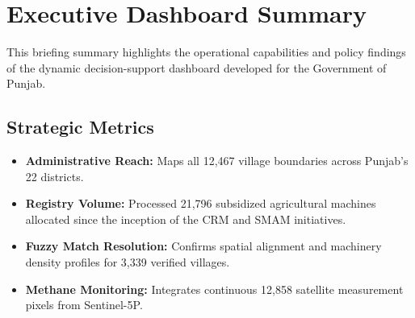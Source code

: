 \documentclass[12pt,a4paper]{report}
\begin{document}
\newpage

\chapter*{Executive Dashboard Summary}
This briefing summary highlights the operational capabilities and policy findings of the dynamic decision-support dashboard developed for the Government of Punjab.

\section*{Strategic Metrics}
\begin{itemize}
    \item \textbf{Administrative Reach:} Maps all 12,467 village boundaries across Punjab's 22 districts.
    \item \textbf{Registry Volume:} Processed 21,796 subsidized agricultural machines allocated since the inception of the CRM and SMAM initiatives.
    \item \textbf{Fuzzy Match Resolution:} Confirms spatial alignment and machinery density profiles for 3,339 verified villages.
    \item \textbf{Methane Monitoring:} Integrates continuous 12,858 satellite measurement pixels from Sentinel-5P.
\end{itemize}
\end{document}
